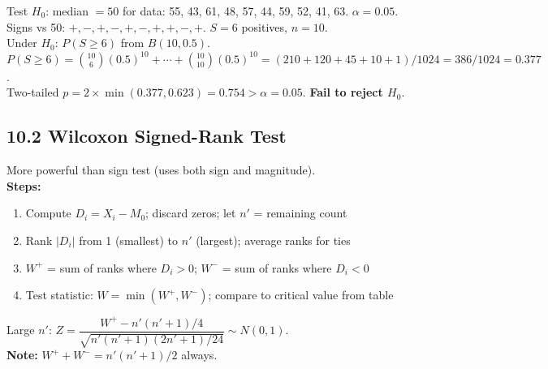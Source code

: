 \documentclass[12pt]{article}
\begin{document}
\begin{examplebox}
Test $H_0$: median $=50$ for data: 55, 43, 61, 48, 57, 44, 59, 52, 41, 63. $\alpha=0.05$.\\[4pt]
Signs vs 50: $+,-,+,-,+,-,+,+,-,+$. \quad $S=6$ positives, $n=10$.\\[4pt]
Under $H_0$: $P(S\geq6)$ from $B(10,0.5)$.\\
$P(S\geq6)=\binom{10}{6}(0.5)^{10}+\cdots+\binom{10}{10}(0.5)^{10}=(210+120+45+10+1)/1024=386/1024=0.377$.\\
Two-tailed $p=2\times\min(0.377,0.623)=0.754>\alpha=0.05$. \textbf{Fail to reject $H_0$}.
\end{examplebox}

\subsection{10.2 Wilcoxon Signed-Rank Test}

\begin{defbox}
More powerful than sign test (uses both sign and magnitude).\\[4pt]
\textbf{Steps:}
\begin{enumerate}[noitemsep,label=\textbf{\arabic*.}]
  \item Compute $D_i=X_i-M_0$; discard zeros; let $n'$ = remaining count
  \item Rank $|D_i|$ from 1 (smallest) to $n'$ (largest); average ranks for ties
  \item $W^+$ = sum of ranks where $D_i>0$; \quad $W^-$ = sum of ranks where $D_i<0$
  \item Test statistic: $W=\min(W^+,W^-)$; compare to critical value from table
\end{enumerate}
Large $n'$: $Z=\dfrac{W^+-n'(n'+1)/4}{\sqrt{n'(n'+1)(2n'+1)/24}}\sim N(0,1)$.\\[4pt]
\textbf{Note:} $W^++W^-=n'(n'+1)/2$ always.
\end{defbox}
\end{document}
